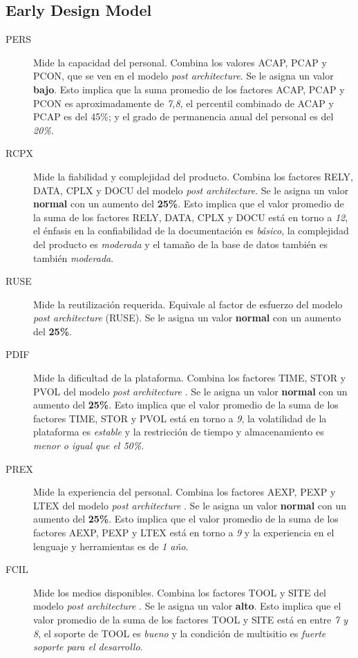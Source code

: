 \documentclass[11pt,a4paper,spanish,twoside]{book}
\begin{document}
\subsection{Early Design Model}
\begin{description}
\item[PERS] Mide la capacidad del personal. Combina los valores ACAP, PCAP y
PCON, que se ven en el modelo \emph{post architecture}. Se le asigna un
valor \textbf{bajo}. Esto implica que la suma promedio de los factores
ACAP, PCAP y PCON es aproximadamente de \emph{7,8}, el percentil combinado
de ACAP y PCAP es del 45\%; y el grado de permanencia anual del personal es
del \emph{20\%}.

\item[RCPX] Mide la fiabilidad y complejidad del producto. Combina los
factores RELY, DATA, CPLX y DOCU del modelo \emph{post architecture}. Se le
asigna un valor \textbf{normal} con un aumento del \textbf{25\%}. Esto
implica que el valor promedio de la suma de los factores RELY, DATA, CPLX y
DOCU está en torno a \emph{12}, el énfasis en la confiabilidad de la
documentación es \emph{básico}, la complejidad del producto es
\emph{moderada} y el tamaño de la base de datos también es también
\emph{moderada}.

\item[RUSE] Mide la reutilización requerida. Equivale al factor de esfuerzo
del modelo \emph{post architecture} (RUSE). Se le asigna un valor
\textbf{normal} con un aumento del \textbf{25\%}.

\item[PDIF] Mide la dificultad de la plataforma. Combina los factores TIME, 
STOR y PVOL del modelo \emph{post architecture} . Se le asigna un valor
\textbf{normal} con un aumento del \textbf{25\%}. Esto implica que el valor 
promedio de la suma de los factores TIME, STOR y PVOL está en torno a \emph{9},
la volatilidad de la plataforma es \emph{estable} y la restricción de tiempo y
almacenamiento es \emph{menor o igual que el 50\%}.

\item[PREX] Mide la experiencia del personal. Combina los factores AEXP, PEXP y
LTEX del modelo \emph{post architecture} . Se le asigna un valor 
\textbf{normal} con un aumento del \textbf{25\%}. Esto implica que el valor 
promedio de la suma de los factores AEXP, PEXP y LTEX está en torno a \emph{9}
y la experiencia en el lenguaje y herramientas es de \emph{1 año}.

\item[FCIL] Mide los medios disponibles. Combina los factores TOOL y SITE del 
modelo \emph{post architecture} . Se le asigna un valor \textbf{alto}. Esto 
implica que el valor promedio de la suma de los factores TOOL y SITE está en 
entre \emph{7 y 8}, el soporte de TOOL es \emph{bueno} y la condición de 
multisitio es \emph{fuerte soporte para el desarrollo}.

\end{description}
\end{document}
